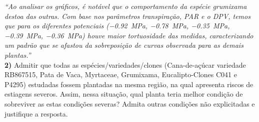 \documentclass[a4paper, 12pt]{article}
\numberwithin{equation}{section}
\begin{document}
	\noindent\textit{``Ao analisar os gráficos, é notável que o comportamento da espécie grumixama destoa das outras. Com base nos parâmetros transpiração, PAR e o DPV, temos que para os diferentes potenciais (\SI{-.92}{\mega\pascal}, \SI{-.78}{\mega\pascal}, \SI{-.35}{\mega\pascal}, \SI{-.39}{\mega\pascal}, \SI{-.36}{\mega\pascal}) houve maior tortuosidade das medidas, caracterizando um padrão que se afastou da sobreposição de curvas observada para as demais plantas.''}\\
	
	\noindent\textbf{2)} Admitir que todas as espécies/variedades/clones (Cana-de-açúcar variedade RB867515, Pata de Vaca, Myrtaceae, Grumixama, Eucalipto-Clones C041 e P4295) estudadas fossem plantadas na mesma região, na qual apresenta riscos de estiagens severos. Assim, nessa situação, qual planta teria melhor condição de sobreviver as estas condições severas? Admita outras condições não explicitadas e justifique a resposta.
	
\end{document}
